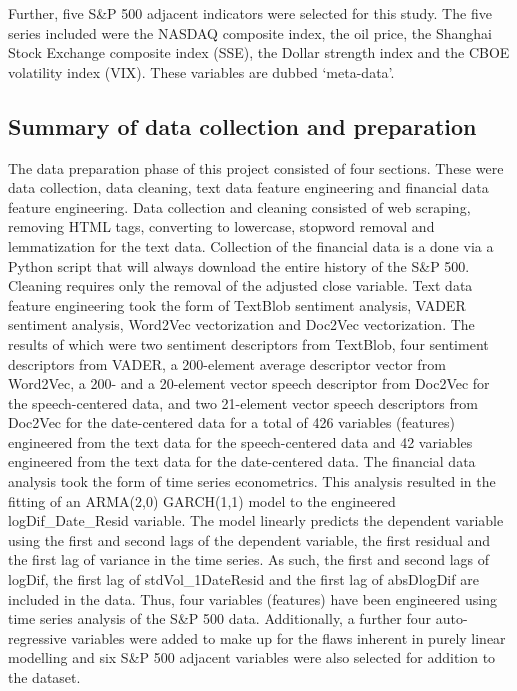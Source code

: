 \documentclass[11pt,preprint, authoryear]{elsarticle}
\numberwithin{equation}{section}
\numberwithin{figure}{section}
\numberwithin{table}{section}
\begin{document}
Further, five S\&P 500 adjacent indicators were selected for this study.
The five series included were the NASDAQ composite index, the oil price,
the Shanghai Stock Exchange composite index (SSE), the Dollar strength
index and the CBOE volatility index (VIX). These variables are dubbed
`meta-data'.

\hypertarget{summary-of-data-collection-and-preparation}{%
\subsection{Summary of data collection and
preparation}\label{summary-of-data-collection-and-preparation}}

The data preparation phase of this project consisted of four sections.
These were data collection, data cleaning, text data feature engineering
and financial data feature engineering. Data collection and cleaning
consisted of web scraping, removing HTML tags, converting to lowercase,
stopword removal and lemmatization for the text data. Collection of the
financial data is a done via a Python script that will always download
the entire history of the S\&P 500. Cleaning requires only the removal
of the adjusted close variable. Text data feature engineering took the
form of TextBlob sentiment analysis, VADER sentiment analysis, Word2Vec
vectorization and Doc2Vec vectorization. The results of which were two
sentiment descriptors from TextBlob, four sentiment descriptors from
VADER, a 200-element average descriptor vector from Word2Vec, a 200- and
a 20-element vector speech descriptor from Doc2Vec for the
speech-centered data, and two 21-element vector speech descriptors from
Doc2Vec for the date-centered data for a total of 426 variables
(features) engineered from the text data for the speech-centered data
and 42 variables engineered from the text data for the date-centered
data. The financial data analysis took the form of time series
econometrics. This analysis resulted in the fitting of an ARMA(2,0)
GARCH(1,1) model to the engineered logDif\_Date\_Resid variable. The
model linearly predicts the dependent variable using the first and
second lags of the dependent variable, the first residual and the first
lag of variance in the time series. As such, the first and second lags
of logDif, the first lag of stdVol\_1DateResid and the first lag of
absDlogDif are included in the data. Thus, four variables (features)
have been engineered using time series analysis of the S\&P 500 data.
Additionally, a further four auto-regressive variables were added to
make up for the flaws inherent in purely linear modelling and six S\&P
500 adjacent variables were also selected for addition to the dataset.
\end{document}
